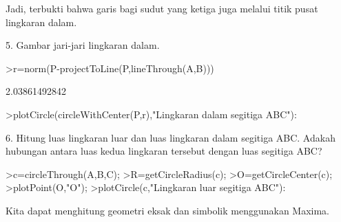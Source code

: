 \documentclass[a4paper,10pt]{article}
\begin{document}
\begin{eulernotebook}
\begin{eulercomment}
\begin{eulercomment}
\begin{eulercomment}
\begin{eulercomment}
\begin{eulercomment}
\begin{eulercomment}
\begin{eulercomment}
\begin{eulercomment}
\begin{eulercomment}
\begin{eulercomment}
\begin{eulercomment}
\begin{eulercomment}
\begin{eulercomment}
\begin{eulercomment}
\begin{eulercomment}
\begin{eulercomment}
\begin{eulercomment}
\begin{eulercomment}
\begin{eulercomment}
\begin{eulercomment}
\begin{eulercomment}
\begin{eulercomment}
\begin{eulercomment}
\begin{eulercomment}
\begin{eulercomment}
\begin{eulercomment}
\begin{eulercomment}
\begin{eulercomment}
\begin{eulercomment}
\begin{eulercomment}
\begin{eulercomment}
\begin{eulercomment}
\begin{eulercomment}
\begin{eulercomment}
\begin{eulercomment}
\begin{eulercomment}
\begin{eulercomment}
\begin{eulercomment}
\begin{eulerprompt}
\end{eulerprompt}
\begin{eulercomment}
Jadi, terbukti bahwa garis bagi sudut yang ketiga juga melalui titik
pusat lingkaran dalam.

5. Gambar jari-jari lingkaran dalam.
\end{eulercomment}
\begin{eulerprompt}
>r=norm(P-projectToLine(P,lineThrough(A,B)))
\end{eulerprompt}
\begin{euleroutput}
  2.03861492842
\end{euleroutput}
\begin{eulerprompt}
>plotCircle(circleWithCenter(P,r),"Lingkaran dalam segitiga ABC"):
\end{eulerprompt}
\begin{eulercomment}
6. Hitung luas lingkaran luar dan luas lingkaran dalam segitiga ABC.
Adakah hubungan antara luas kedua lingkaran tersebut dengan luas
segitiga ABC?
\end{eulercomment}
\begin{eulerprompt}
>c=circleThrough(A,B,C);
>R=getCircleRadius(c);
>O=getCircleCenter(c);
>plotPoint(O,"O");
>plotCircle(c,"Lingkaran luar segitiga ABC"):
\end{eulerprompt}
\begin{eulercomment}
Kita dapat menghitung geometri eksak dan simbolik menggunakan Maxima.


\end{eulercomment}
\end{eulercomment}
\end{eulercomment}
\end{eulercomment}
\end{eulercomment}
\end{eulercomment}
\end{eulercomment}
\end{eulercomment}
\end{eulercomment}
\end{eulercomment}
\end{eulercomment}
\end{eulercomment}
\end{eulercomment}
\end{eulercomment}
\end{eulercomment}
\end{eulercomment}
\end{eulercomment}
\end{eulercomment}
\end{eulercomment}
\end{eulercomment}
\end{eulercomment}
\end{eulercomment}
\end{eulercomment}
\end{eulercomment}
\end{eulercomment}
\end{eulercomment}
\end{eulercomment}
\end{eulercomment}
\end{eulercomment}
\end{eulercomment}
\end{eulercomment}
\end{eulercomment}
\end{eulercomment}
\end{eulercomment}
\end{eulercomment}
\end{eulercomment}
\end{eulercomment}
\end{eulercomment}
\end{eulercomment}
\end{eulernotebook}
\end{document}
